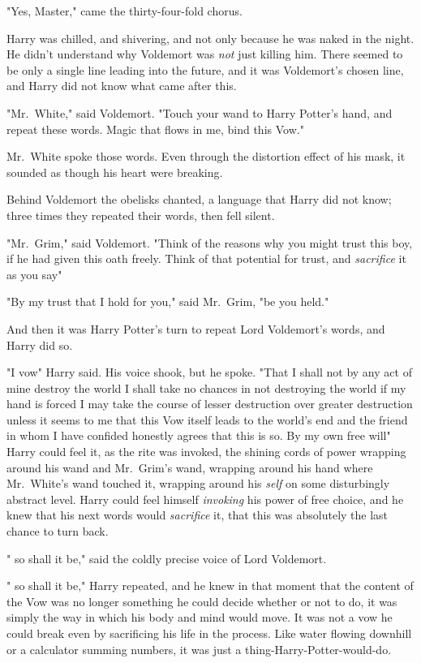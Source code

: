 "Yes, Master," came the thirty-four-fold chorus.

Harry was chilled, and shivering, and not only because he was naked in the
night. He didn't understand why Voldemort was \emph{not} just killing him.
There seemed to be only a single line leading into the future, and it was
Voldemort's chosen line, and Harry did not know what came after this.

"Mr.~White," said Voldemort. "Touch your wand to Harry Potter's hand, and
repeat these words. Magic that flows in me, bind this Vow."

Mr.~White spoke those words. Even through the distortion effect of his mask, it
sounded as though his heart were breaking.

Behind Voldemort the obelisks chanted, a language that Harry did not know;
three times they repeated their words, then fell silent.

"Mr.~Grim," said Voldemort. "Think of the reasons why you might trust this boy,
if he had given this oath freely. Think of that potential for trust, and
\emph{sacrifice} it as you say{\el}"

"By my trust that I hold for you," said Mr.~Grim, "be you held."

And then it was Harry Potter's turn to repeat Lord Voldemort's words, and Harry
did so.

"I vow{\el}" Harry said. His voice shook, but he spoke. "That I shall
not{\el} by any act of mine{\el} destroy the world{\el} I shall take
no chances{\el} in not destroying the world{\el} if my hand is
forced{\el} I may take the course{\el} of lesser destruction over greater
destruction{\el} unless it seems to me that this Vow itself{\el} leads to
the world's end{\el} and the friend{\el} in whom I have confided
honestly{\el} agrees that this is so. By my own free will{\el}" Harry
could feel it, as the rite was invoked, the shining cords of power wrapping
around his wand and Mr.~Grim's wand, wrapping around his hand where Mr.~White's
wand touched it, wrapping around his \emph{self} on some disturbingly abstract
level. Harry could feel himself \emph{invoking} his power of free choice, and
he knew that his next words would \emph{sacrifice} it, that this was absolutely
the last chance to turn back.

"{\el} so shall it be," said the coldly precise voice of Lord Voldemort.

"{\el} so shall it be," Harry repeated, and he knew in that moment that the
content of the Vow was no longer something he could decide whether or not to
do, it was simply the way in which his body and mind would move. It was not a
vow he could break even by sacrificing his life in the process. Like water
flowing downhill or a calculator summing numbers, it was just a
thing-Harry-Potter-would-do.

